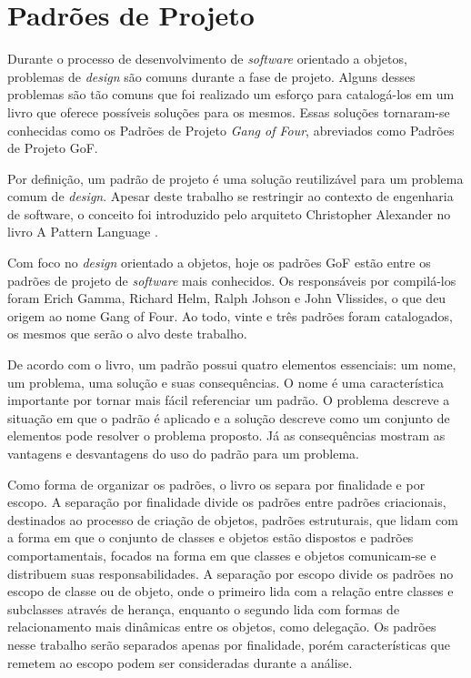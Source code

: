 \chapter{Padrões de Projeto}

Durante o processo de desenvolvimento de \textit{software} 
orientado a objetos, 
problemas de \textit{design} são comuns durante a 
fase de projeto. Alguns desses problemas 
são tão comuns que foi realizado um esforço para catalogá-los 
em um livro \cite{gamma:1995} que oferece possíveis 
soluções para os mesmos. 
Essas soluções tornaram-se conhecidas como 
os Padrões de Projeto \textit{Gang of Four}, abreviados 
como Padrões de Projeto GoF.

Por definição, um padrão de projeto é uma solução 
reutilizável para um problema comum de \textit{design}. Apesar 
deste trabalho se restringir ao contexto de engenharia 
de software, o conceito foi introduzido pelo arquiteto 
Christopher Alexander no livro A Pattern Language 
\cite{alexanderpatternlanguage}.

Com foco no \textit{design} orientado a objetos, hoje os 
padrões GoF estão entre os padrões de 
projeto de \textit{software} mais conhecidos. Os responsáveis 
por compilá-los foram Erich Gamma, Richard Helm, 
Ralph Johson e John Vlissides, o que deu origem ao 
nome Gang of Four. Ao todo, vinte e três 
padrões foram catalogados, os mesmos que serão o alvo 
deste trabalho.

De acordo com o livro, um padrão possui quatro elementos 
essenciais: um nome, um problema, uma solução e suas 
consequências. O nome é uma característica importante 
por tornar mais fácil referenciar um padrão. O problema 
descreve a situação em que o padrão é aplicado e 
a solução descreve como um conjunto de elementos pode 
resolver o problema proposto. Já as consequências 
mostram as vantagens e desvantagens do uso do padrão 
para um problema.

Como forma de organizar os padrões, o livro os separa 
por finalidade e por escopo. A separação por finalidade 
divide os padrões entre padrões criacionais, 
destinados ao processo de criação de objetos, padrões 
estruturais, que lidam com a forma em que o conjunto de 
classes e objetos estão dispostos e padrões comportamentais, 
focados na forma em que classes e objetos comunicam-se 
e distribuem suas responsabilidades. A separação por 
escopo divide os padrões no escopo de classe ou de objeto, 
onde o primeiro lida com a relação entre classes e 
subclasses através de herança, enquanto o segundo lida 
com formas de relacionamento mais dinâmicas entre os 
objetos, como delegação. Os padrões nesse trabalho 
serão separados apenas por finalidade, porém 
características que remetem ao escopo 
podem ser consideradas durante a análise.


